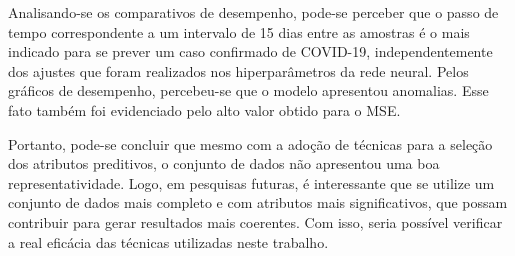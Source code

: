 \documentclass{ieeeaccess}
\begin{document}
Analisando-se os comparativos de desempenho, pode-se perceber que o passo de tempo correspondente a um intervalo de 15 dias entre as amostras é o mais indicado para se prever um caso confirmado de COVID-19, independentemente dos ajustes que foram realizados nos hiperparâmetros da rede neural. Pelos gráficos de desempenho, percebeu-se que o modelo apresentou anomalias. Esse fato também foi evidenciado pelo alto valor obtido para o MSE. 

Portanto, pode-se concluir que mesmo com a adoção de técnicas para a seleção dos atributos preditivos, o conjunto de dados não apresentou uma boa representatividade. Logo, em pesquisas futuras, é interessante que se utilize um conjunto de dados mais completo e com atributos mais significativos, que possam contribuir para gerar resultados mais coerentes. Com isso, seria possível verificar a real eficácia das técnicas utilizadas neste trabalho.

\begin{comment}

Relatório 2B.3
O terceiro relatório do segundo bimestre deverá conter uma seção de conclusões e trabalhos futuros. As seguintes perguntas devem ser abordadas:

O aprendizado foi bem sucedido? Justifique.
Quais as limitações da base de dados (possivelmente incluindo diferente tipo de coleta, pré-processamento, etc.) e o que seria necessário para melhorá-la para ter melhor desempenho no aprendizado?
Quais as limitações das técnicas de aprendizado utilizadas e quais outras poderiam ser utilizadas futuramente?
Escreva outras conclusões pertinentes ao seu trabalho.
Mantenha as demais seções já escritas até o momento.

--

\end{comment}


\end{document}
